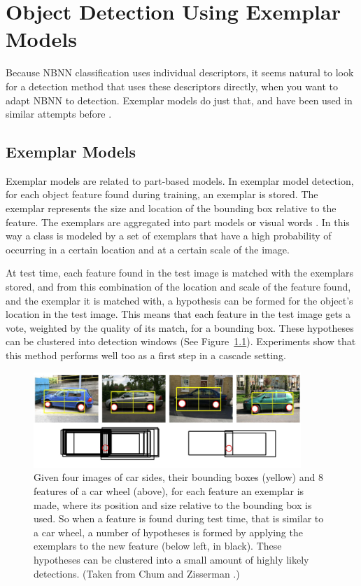\chapter{Object Detection Using Exemplar Models} %
\label{cha:object_detection}

Because NBNN classification uses individual descriptors, it seems natural to look for a detection method that uses these descriptors directly, when you want to adapt NBNN to detection. Exemplar models do just that, and have been used in similar attempts before \cite{becker2012codebook}.

\section{Exemplar Models} %
\label{sub:exemplar_models}

Exemplar models \cite{leibe2004combined, chum2007exemplar} are related to part-based models. In exemplar model detection, for each object feature found during training, an exemplar is stored. The exemplar represents the size and location of the bounding box relative to the feature. The exemplars are aggregated into part models \cite{leibe2004combined} or visual words \cite{chum2007exemplar}. In this way a class is modeled by a set of exemplars that have a high probability of occurring in a certain location and at a certain scale of the image.

At test time, each feature found in the test image is matched with the exemplars stored, and from this combination of the location and scale of the feature found, and the exemplar it is matched with, a hypothesis can be formed for the object's location in the test image. This means that each feature in the test image gets a vote, weighted by the quality of its match, for a bounding box. These hypotheses can be clustered into detection windows (See Figure~\ref{fig:exemplar_model}). Experiments show that this method performs well too as a first step in a cascade setting. \cite{vedaldi2009multiple}

\begin{figure}[hbt]
    \centering
    \includegraphics[width=0.9\textwidth]{ExemplarModel}
    \caption{Given four images of car sides, their bounding boxes (yellow) and 8 features of a car wheel (above), for each feature an exemplar is made, where its position and size relative to the bounding box is used. So when a feature is found during test time, that is similar to a car wheel, a number of hypotheses is formed by applying the exemplars to the new feature (below left, in black). These hypotheses can be clustered into a small amount of highly likely detections. (Taken from Chum and Zisserman \cite{chum2007exemplar}.)}
    \label{fig:exemplar_model}
\end{figure}

